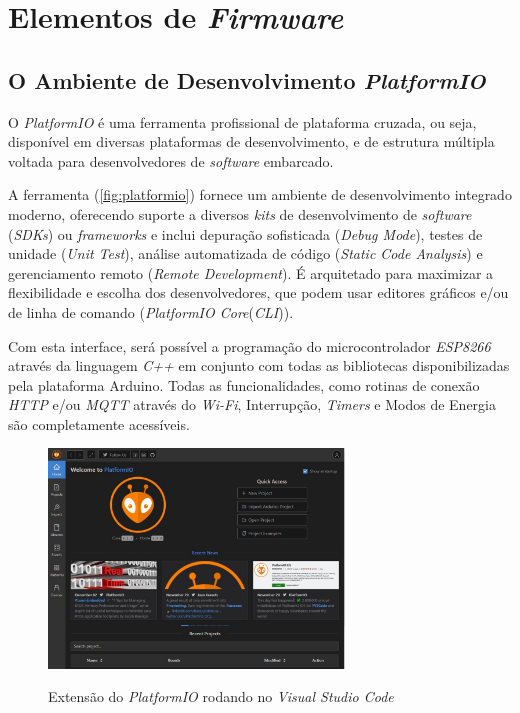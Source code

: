 
\section{Elementos de \textit{Firmware}}

\subsection{O Ambiente de Desenvolvimento \textit{PlatformIO}}


O \textit{PlatformIO} é uma ferramenta profissional de plataforma cruzada, ou seja, disponível em diversas plataformas de desenvolvimento, e de estrutura múltipla voltada para desenvolvedores de \textit{software} embarcado.

A ferramenta (\autoref{fig:platformio}) fornece um ambiente de desenvolvimento integrado moderno, oferecendo suporte a diversos \textit{kits} de desenvolvimento de \textit{software} (\textit{SDKs}) ou \textit{frameworks} e inclui depuração sofisticada (\textit{Debug Mode}), testes de unidade (\textit{Unit Test}), análise automatizada de código (\textit{Static Code Analysis}) e gerenciamento remoto (\textit{Remote Development}). É arquitetado para maximizar a flexibilidade e escolha dos desenvolvedores, que podem usar editores gráficos e/ou de linha de comando (\textit{PlatformIO Core}(\textit{CLI})).

Com esta interface, será possível a programação do microcontrolador \textit{ESP8266} através da linguagem \textit{C++} em conjunto com todas as bibliotecas disponibilizadas pela plataforma Arduino. Todas as funcionalidades, como rotinas de conexão \textit{HTTP} e/ou \textit{MQTT} através do \textit{Wi-Fi}, Interrupção, \textit{Timers} e Modos de Energia são completamente acessíveis. 

\begin{figure}[H]
	\centering
	\caption{Extensão do \textit{PlatformIO} rodando no \textit{Visual Studio Code}}
	\includegraphics[width=0.7\textwidth]{figuras/platformio.jpg}
	\label{fig:platformio}
	
\end{figure}


